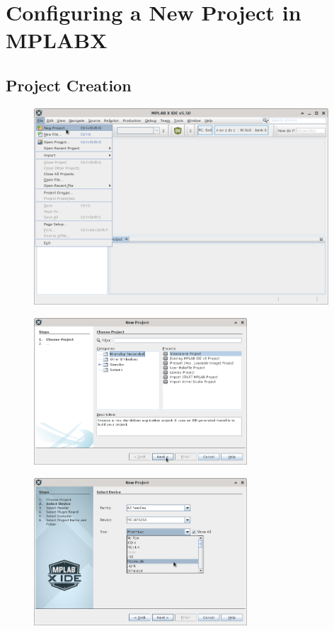 \section{Configuring a New Project in MPLABX}

\subsection{Project Creation}

\begin{figure}[H]
\center
\includegraphics[width=0.98\textwidth]{img/hmd/mplab10.png} 
\end{figure} 

\begin{figure}[H]
\center
\includegraphics[width=0.71\textwidth]{img/hmd/mplab11.png} 
\end{figure} 

\begin{figure}[H]
\center
\includegraphics[width=0.71\textwidth]{img/hmd/mplab12.png} 
\end{figure}

